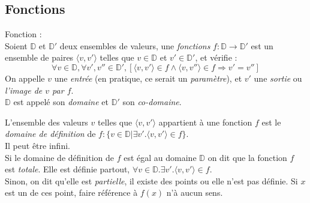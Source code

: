     \subsection{Fonctions}
    \begin{definition}
        Fonction :\\
        Soient \(\mathbb{D}\) et \(\mathbb{D'}\) deux ensembles de valeurs, une \emph{fonctions} \(f:\mathbb{D}\rightarrow\mathbb{D'}\) est un ensemble de paires \(\langle v,v'\rangle\) telles que \(v\in\mathbb{D}\) et \(v'\in\mathbb{D'}\), et vérifie :
        \begin{equation}
            \forall v\in\mathbb{D}, \forall v',v''\in\mathbb{D'}, \left[\langle v,v'\rangle\in f\wedge\langle v,v''\rangle\in f \Rightarrow v'=v''\right]
        \end{equation}
        On appelle \(v\) une \emph{entrée} (en pratique, ce serait un \emph{paramètre}), et \(v'\) une \emph{sortie} ou \emph{l'image de \(v\) par \(f\)}.\\
        \(\mathbb{D}\) est appelé son \emph{domaine} et \(\mathbb{D'}\) son \emph{co-domaine}.\par
        L'ensemble des valeurs \(v\) telles que \(\langle v,v'\rangle\) appartient \`a une fonction \(f\) est le \emph{domaine de d\'efinition} de \(f\colon\{v\in\mathbb{D}|\exists v'.\langle v,v'\rangle\in f\}\).\\
        Il peut \^etre infini.\\
        Si le domaine de d\'efinition de \(f\) est \'egal au domaine \(\mathbb{D}\) on dit que la fonction \(f\) est \emph{totale}. Elle est d\'efinie partout, \(\forall v\in\mathbb{D}.\exists v'.\langle v,v'\rangle\in f\).\\
        Sinon, on dit qu'elle est \emph{partielle}, il existe des points ou elle n'est pas d\'efinie. Si \(x\) est un de ces point, faire r\'ef\'erence \`a \(f(x)\) n'\`a aucun sens. 
    \end{definition}

